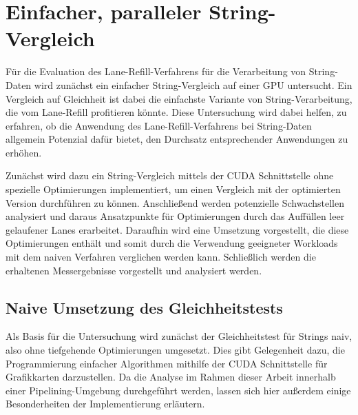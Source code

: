 \chapter{Einfacher, paralleler String-Vergleich}

Für die Evaluation des Lane-Refill-Verfahrens für die Verarbeitung von String-Daten wird zunächst ein einfacher String-Vergleich auf einer GPU untersucht.
Ein Vergleich auf Gleichheit ist dabei die einfachste Variante von String-Verarbeitung, die vom Lane-Refill profitieren könnte.
Diese Untersuchung wird dabei helfen, zu erfahren, ob die Anwendung des Lane-Refill-Verfahrens bei String-Daten allgemein Potenzial dafür bietet, den Durchsatz entsprechender Anwendungen zu erhöhen.

Zunächst wird dazu ein String-Vergleich mittels der CUDA Schnittstelle ohne spezielle Optimierungen implementiert, um einen Vergleich mit der optimierten Version durchführen zu können.
Anschließend werden potenzielle Schwachstellen analysiert und daraus Ansatzpunkte für Optimierungen durch das Auffüllen leer gelaufener Lanes erarbeitet.
Daraufhin wird eine Umsetzung vorgestellt, die diese Optimierungen enthält und somit durch die Verwendung geeigneter Workloads mit dem naiven Verfahren verglichen werden kann.
Schließlich werden die erhaltenen Messergebnisse vorgestellt und analysiert werden.

\section{Naive Umsetzung des Gleichheitstests}

Als Basis für die Untersuchung wird zunächst der Gleichheitstest für Strings naiv, also ohne tiefgehende Optimierungen umgesetzt.
Dies gibt Gelegenheit dazu, die Programmierung einfacher Algorithmen mithilfe der CUDA Schnittstelle für Grafikkarten darzustellen.
Da die Analyse im Rahmen dieser Arbeit innerhalb einer Pipelining-Umgebung durchgeführt werden, lassen sich hier außerdem einige Besonderheiten der Implementierung erläutern.

\newpage


